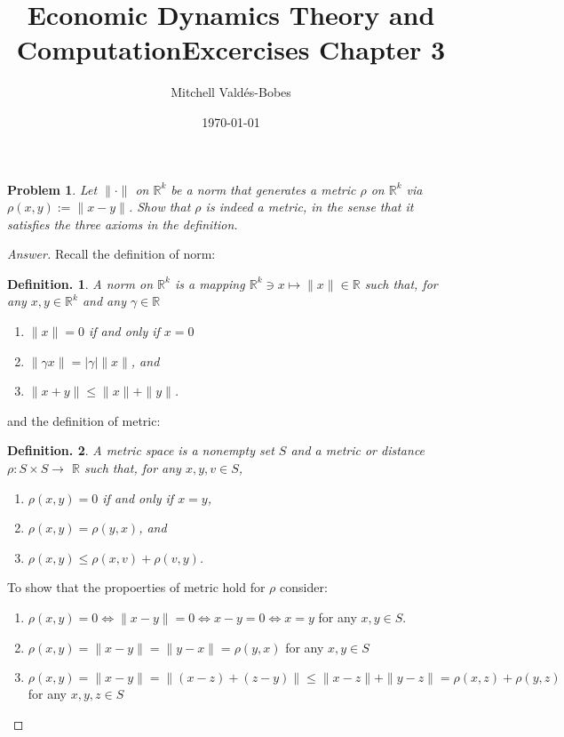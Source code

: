\documentclass{article}
\title{Economic Dynamics Theory and Computation\newline Excercises Chapter 3}
\author{Mitchell Valdés-Bobes}
\date{\today}
\newtheorem{defin}{Definition.}
\newtheorem{problem}{Problem}
\begin{document}
\maketitle

\begin{problem}
    Let $\|\cdot\|$ on $\mathbb{R}^{k}$ be a norm that generates a metric $\rho$ on $\mathbb{R}^{k}$ via $\rho(x, y):=\|x-y\|$. 
    Show that $\rho$ is indeed a metric, in the sense that it satisfies the three axioms in the definition.
\end{problem}

\begin{proof}[Answer]
    Recall the definition of norm:
    \begin{defin}
        A norm on $\mathbb{R}^{k}$ is a mapping $\mathbb{R}^{k} \ni x \mapsto\|x\| \in \mathbb{R}$ such that, for any $x, y \in \mathbb{R}^{k}$ and any $\gamma \in \mathbb{R}$
        \begin{enumerate}
            \item $\|x\|=0$ if and only if $x=0$
            \item $\|\gamma x\|=|\gamma|\|x\|$, and
            \item $\|x+y\| \leq\|x\|+\|y\|$.
        \end{enumerate}
    \end{defin}
    and the definition of metric:
    \begin{defin}
    A metric space is a nonempty set $S$ and a metric or distance $\rho: S \times S \rightarrow$ $\mathbb{R}$ such that, for any $x, y, v \in S$,
        \begin{enumerate}
            \item $\rho(x, y)=0$ if and only if $x=y$,
            \item $\rho(x, y)=\rho(y, x)$, and
            \item $\rho(x, y) \leq \rho(x, v)+\rho(v, y)$.
        \end{enumerate}
    \end{defin}

    To show that the propoerties of metric hold for $\rho$ consider:
    \begin{enumerate}
        \item $\rho(x,y)=0\iff\|x-y\|=0\iff x-y=0\iff x=y$  for any $x,y \in S$.
        \item $\rho(x,y)=\|x-y\|=\|y-x\|=\rho(y,x)$ for any $x,y \in S$
        \item $\rho(x,y)=\|x-y\|=\|(x-z)+(z-y)\|\leq\|x-z\|+ \|y-z\| = \rho(x,z) + \rho(y,z)$ for any $x,y,z\in S$
    \end{enumerate}

\end{proof}
\end{document}
